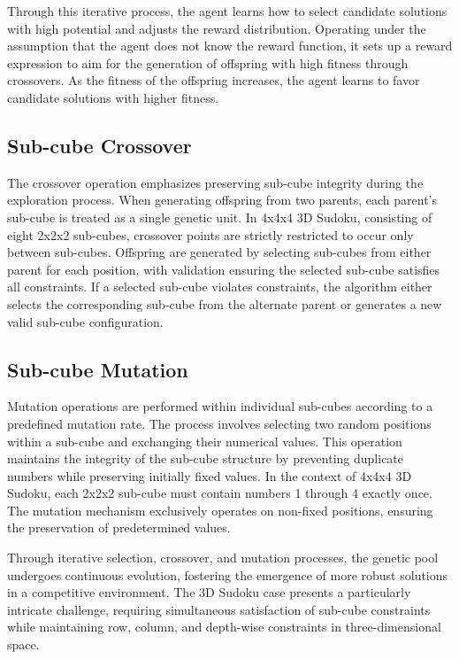 \documentclass{article}
\begin{document}
Through this iterative process, the agent learns how to select candidate solutions with high potential and adjusts the reward distribution. Operating under the assumption that the agent does not know the reward function, it sets up a reward expression to aim for the generation of offspring with high fitness through crossovers. As the fitness of the offspring increases, the agent learns to favor candidate solutions with higher fitness.

\subsection{Sub-cube Crossover}

The crossover operation emphasizes preserving sub-cube integrity during the exploration process. When generating offspring from two parents, each parent's sub-cube is treated as a single genetic unit. In 4x4x4 3D Sudoku, consisting of eight 2x2x2 sub-cubes, crossover points are strictly restricted to occur only between sub-cubes. Offspring are generated by selecting sub-cubes from either parent for each position, with validation ensuring the selected sub-cube satisfies all constraints. If a selected sub-cube violates constraints, the algorithm either selects the corresponding sub-cube from the alternate parent or generates a new valid sub-cube configuration.

\subsection{Sub-cube Mutation}

Mutation operations are performed within individual sub-cubes according to a predefined mutation rate. The process involves selecting two random positions within a sub-cube and exchanging their numerical values. This operation maintains the integrity of the sub-cube structure by preventing duplicate numbers while preserving initially fixed values. In the context of 4x4x4 3D Sudoku, each 2x2x2 sub-cube must contain numbers 1 through 4 exactly once. The mutation mechanism exclusively operates on non-fixed positions, ensuring the preservation of predetermined values.

Through iterative selection, crossover, and mutation processes, the genetic pool undergoes continuous evolution, fostering the emergence of more robust solutions in a competitive environment. The 3D Sudoku case presents a particularly intricate challenge, requiring simultaneous satisfaction of sub-cube constraints while maintaining row, column, and depth-wise constraints in three-dimensional space.
\end{document}
